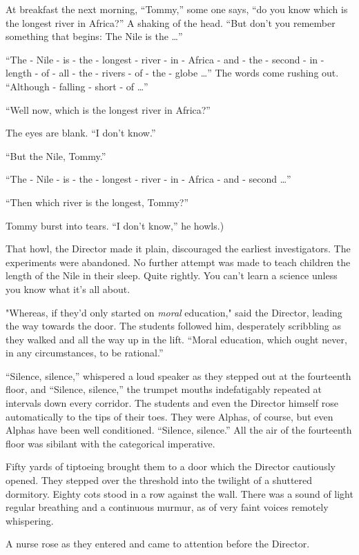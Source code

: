 \documentclass[12pt]{report}
\begin{document}
At breakfast the next morning, ``Tommy,'' some one says, ``do you know
which is the longest river in Africa?'' A shaking of the head. ``But
don't you remember something that begins: The Nile is the \ldots{}''

``The - Nile - is - the - longest - river - in - Africa - and - the -
second - in - length - of - all - the - rivers - of - the - globe
\ldots{}'' The words come rushing out. ``Although - falling - short - of
\ldots{}''

``Well now, which is the longest river in Africa?''

The eyes are blank. ``I don't know.''

``But the Nile, Tommy.''

``The - Nile - is - the - longest - river - in - Africa - and - second
\ldots{}''

``Then which river is the longest, Tommy?''

Tommy burst into tears. ``I don't know,'' he howls.)

That howl, the Director made it plain, discouraged the earliest
investigators. The experiments were abandoned. No further attempt was
made to teach children the length of the Nile in their sleep. Quite
rightly. You can't learn a science unless you know what it's all about.

"Whereas, if they'd only started on \emph{moral} education," said the
Director, leading the way towards the door. The students followed him,
desperately scribbling as they walked and all the way up in the lift.
``Moral education, which ought never, in any circumstances, to be
rational.''

``Silence, silence,'' whispered a loud speaker as they stepped out at
the fourteenth floor, and ``Silence, silence,'' the trumpet mouths
indefatigably repeated at intervals down every corridor. The students
and even the Director himself rose automatically to the tips of their
toes. They were Alphas, of course, but even Alphas have been well
conditioned. ``Silence, silence.'' All the air of the fourteenth floor
was sibilant with the categorical imperative.

Fifty yards of tiptoeing brought them to a door which the Director
cautiously opened. They stepped over the threshold into the twilight of
a shuttered dormitory. Eighty cots stood in a row against the wall.
There was a sound of light regular breathing and a continuous murmur, as
of very faint voices remotely whispering.

A nurse rose as they entered and came to attention before the Director.
\end{document}
